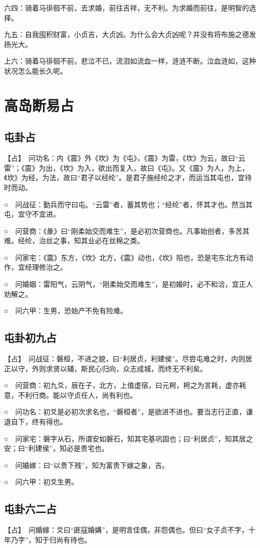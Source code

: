 \documentclass[12pt,oneside]{book}
\begin{document}
六四：骑着马徘徊不前，去求婚，前往吉祥，无不利。为求婚而前往，是明智的选择。

九五：自我囤积财富，小贞吉，大贞凶。为什么会大贞凶呢？并没有将布施之德发扬光大。

上六：骑着马徘徊不前，悲泣不已，流泪如流血一样，涟涟不断。泣血涟如，这种状况怎么能长久呢。


\section{高岛断易占}
\subsection{屯卦占}
【占】　问功名：内《震》外《坎》为《屯》，《震》为雷，《坎》为云，故曰“云雷”；《震》为出，《坎》为入，欲出而复入，故曰《屯》。又《震》为人，为上，《坎》为经，为法，故曰“君子以经纶”。是君子施经纶之才，而运当其屯也，宜待时而动。

○　问战征：勤兵而守曰屯。“云雷”者，蓄其势也；“经纶”者，怀其才也。然当其屯，宜守不宜进。

○　问营商：《彖》曰“刚柔始交而难生”，是必初次营商也。凡事始创者，多苦其难。经纶，治丝之事，知其业必在丝棉之类。

○　问家宅：《震》东方，《坎》北方，《震》动也，《坎》陷也，恐是宅东北方有动作，宜经理修治之。

○　问婚姻：雷阳气，云阴气，“刚柔始交而难生”，是初婚时，必不和洽，宜正人劝解之。

○　问六甲：生男，恐始产不免有险难。

\subsection{屯卦初九占}
【占】　问战征：磐桓，不进之貌，曰“利居贞，利建侯”。尽尝屯难之时，内则居正以守，外则求贤以辅，斯民心归向，众志成城，而终无不利矣。

○　问营商：初九爻，辰在子，北方，上值虚宿，曰元枵，枵之为言耗，虚亦耗意，不利行商。能以守贞任人，尚有利也。

○　问功名：初爻是必初次求名也，“磐桓者”，是欲进不进也。要当志行正直，谦退自下，终有得也。

○　问家宅：磐字从石，所谓安如磐石，知其宅基巩固也；曰“利居贞”，知其居之安；曰“利建侯”，知必是贵宅也。

○　问婚嫁：曰“以贵下贱”，知为富贵下嫁之象，吉。

○　问六甲：初爻生男。

\subsection{屯卦六二占}
【占】　问婚嫁：爻曰“匪寇婚媾”，是明言佳偶，非怨偶也。但曰“女子贞不字，十年乃字”，知于归尚有待也。
\end{document}
